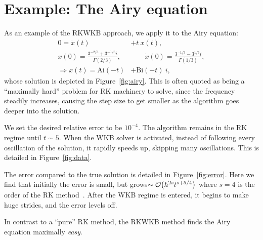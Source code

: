 \section{Example: The Airy equation}


As an example of the RKWKB approach, we apply it to the Airy equation:
\begin{align}
  0=\ddot{x}(t) &+ t\: x(t) ,
  \label{eqn:airy_equation}\\
  x(0)=\frac{3^{-2/3}+3^{-1/6}i}{\Gamma(2/3)},
  &\qquad
  \dot{x}(0) = \frac{3^{-1/3}-3^{1/6}i}{\Gamma(1/3)},
  \nonumber\\
  \Rightarrow x(t) = \mathrm{Ai}(-t) &+ \mathrm{Bi}(-t)\:i,
  \label{eqn:airy_solution}
\end{align}
whose solution is depicted in Figure~\ref{fig:airy}. This is often quoted as being a ``maximally hard'' problem for RK machinery to solve, since the frequency steadily increases, causing the step size to get smaller as the algorithm goes deeper into the solution.

We set the desired relative error to be \(10^{-4}\). The algorithm remains in the RK regime until \(t\sim5\). When the WKB solver is activated, instead of following every oscillation of the solution, it rapidly speeds up, skipping many oscillations. This is detailed in Figure~\ref{fig:data}.

The error compared to the true solution is detailed in Figure~\ref{fig:error}. Here we find that initially the error is small, but grows\({\sim\mathcal{O}{\left(h^{2s} t^{s+5/4}\right)}}\) where \(s=4\) is the order of the RK method~\citep{Iserles02globalerror}. After the WKB regime is entered, it begins to make huge strides, and the error levels off.

In contrast to a ``pure'' RK method, the RKWKB method finds the Airy equation maximally {\em easy}.



